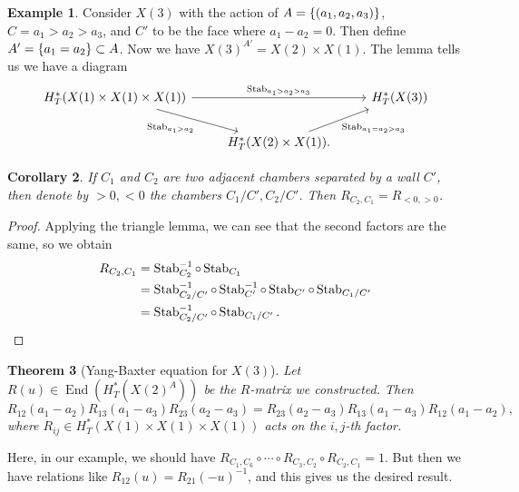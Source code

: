 \documentclass[leqno, openany]{memoir}
\newtheorem{thm}{Theorem}[section]
\newtheorem{cor}[thm]{Corollary}
\theoremstyle{definition}
\newtheorem{exm}[thm]{Example}
\theoremstyle{remark}
\theoremstyle{plain}
\theoremstyle{definition}
\theoremstyle{remark}
\newcommand{\on}[1]{\operatorname{#1}}
\DeclareMathOperator{\End}{End}
\begin{document}
\begin{exm}
    Consider $X(3)$ with the action of $A = \qty{(a_1, a_2, a_3)}$, $C = a_1 > a_2 > a_3$, and $C'$ to be the face where $a_1 - a_2 = 0$. Then define $A' = \qty{a_1 = a_2} \subset A$. Now we have $X(3)^{A'} = X(2) \times X(1)$. The lemma tells us we have a diagram
    \begin{equation*}
    \begin{tikzcd}
        H_T^*(X(1) \times X(1) \times X(1)) \ar{rr}{\on{Stab}_{a_1>a_2>a_3}} \ar[swap]{dr}{\on{Stab}_{a_1 > a_2}} & & H_T^*(X(3)) \\
        & H_T^*(X(2) \times X(1)) \ar[swap]{ur}{\on{Stab}_{a_1 = a_2 > a_3}}.
    \end{tikzcd}
    \end{equation*}
\end{exm}

\begin{cor}
    If $C_1$ and $C_2$ are two adjacent chambers separated by a wall $C'$, then denote by $>0, <0$ the chambers $C_1 / C', C_2/C'$. Then $R_{C_2, C_1} = R_{<0, >0}$.
\end{cor}

\begin{proof}
    Applying the triangle lemma, we can see that the second factors are the same, so we obtain
    \begin{align*}
        R_{C_2, C_1} &= \on{Stab}_{C_2}^{-1} \circ \on{Stab}_{C_1} \\
        &= \on{Stab}_{C_2/C'}^{-1} \circ \on{Stab}_{C'}^{-1} \circ \on{Stab}_{C'} \circ \on{Stab}_{C_1/C'} \\
        &= \on{Stab}_{C_2/C'}^{-1} \circ \on{Stab}_{C_1/C'}. \qedhere
    \end{align*}
\end{proof}

\begin{thm}[Yang-Baxter equation for $X(3)$]
    Let $R(u) \in \End(H_T^*(X(2)^A))$ be the $R$-matrix we constructed. Then 
    \[ R_{12}(a_1-a_2) R_{13}(a_1 - a_3) R_{23}(a_2 - a_3) = R_{23}(a_2 - a_3) R_{13}(a_1 - a_3) R_{12}(a_1 - a_2), \]
    where $R_{ij} \in H_T^*(X(1) \times X(1) \times X(1))$ acts on the $i,j$-th factor.
\end{thm}

Here, in our example, we should have $R_{C_1, C_6} \circ \cdots \circ R_{C_3, C_2} \circ R_{C_2, C_1} = 1$. But then we have relations like $R_{12}(u) = R_{21}(-u)^{-1}$, and this gives us the desired result.
\end{document}
